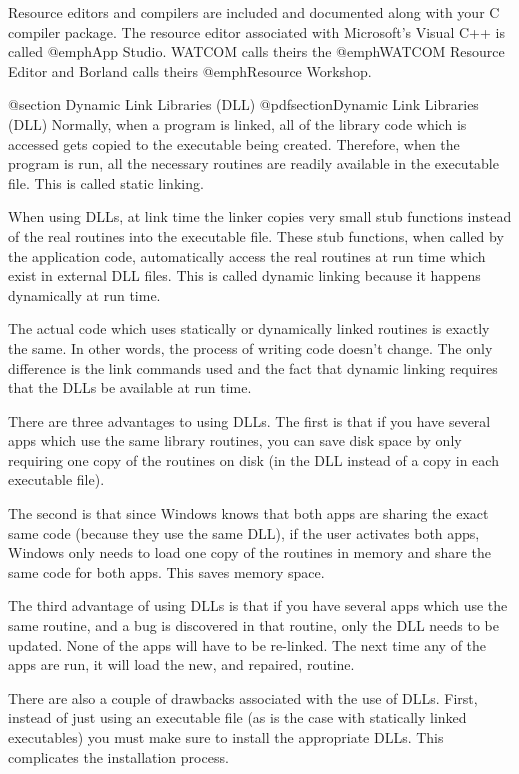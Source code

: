 Resource editors and compilers are included and documented along with
your C compiler package.  The resource editor associated with
Microsoft's Visual C++ is called @emph{App Studio}.  WATCOM calls theirs
the @emph{WATCOM Resource Editor} and Borland calls theirs
@emph{Resource Workshop}.



@section Dynamic Link Libraries (DLL)
@pdfsection{Dynamic Link Libraries (DLL)}
Normally, when a program is linked, all of the library code which is
accessed gets copied to the executable being created.  Therefore, when
the program is run, all the necessary routines are readily available in
the executable file.  This is called static linking.

When using DLLs, at link time the linker copies very small stub
functions instead of the real routines into the executable file.  These
stub functions, when called by the application code, automatically
access the real routines at run time which exist in external DLL files.
This is called dynamic linking because it happens dynamically at run time.

The actual code which uses statically or dynamically linked routines is
exactly the same.  In other words, the process of writing code doesn't
change.  The only difference is the link commands used and the fact that
dynamic linking requires that the DLLs be available at run time.

There are three advantages to using DLLs.  The first is that if you have
several apps which use the same library routines, you can save disk
space by only requiring one copy of the routines on disk (in the DLL
instead of a copy in each executable file).

The second is that since Windows knows that both apps are sharing the
exact same code (because they use the same DLL), if the user activates
both apps, Windows only needs to load one copy of the routines in memory
and share the same code for both apps.  This saves memory space.

The third advantage of using DLLs is that if you have several apps which
use the same routine, and a bug is discovered in that routine, only the
DLL needs to be updated.  None of the apps will have to be re-linked.
The next time any of the apps are run, it will load the new, and repaired,
routine.

There are also a couple of drawbacks associated with the use of DLLs.
First, instead of just using an executable file (as is the case with
statically linked executables) you must make sure to install the appropriate
DLLs.  This complicates the installation process.

